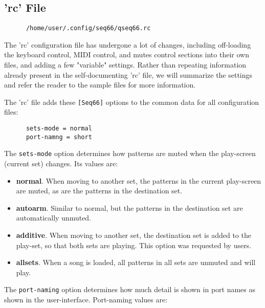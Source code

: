 \subsection{'rc' File}
\label{subsec:configuration_rc}

   \begin{verbatim}
      /home/user/.config/seq66/qseq66.rc
   \end{verbatim}

   The 'rc' configuration file has undergone a lot of changes, including
   off-loading the keyboard control, MIDI control, and mutes control sections
   into their own files, and adding a few "variable" settings.
   Rather than repeating information already present in the self-documenting
   'rc' file, we will summarize the settings and refer the reader to the sample
   files for more information.

   The 'rc' file adds these \texttt{[Seq66]} options to the common
   data for all configuration files:

   \begin{verbatim}
      sets-mode = normal
      port-namng = short
   \end{verbatim}

   The \texttt{sets-mode} option determines how patterns are muted when the
   play-screen (current set) changes.  Its values are:

   \begin{itemize}
      \item \textbf{normal}.
         When moving to another set, the patterns in the
         current play-screen are muted, as are the patterns in the destination
         set.
      \item \textbf{autoarm}.
         Similar to normal, but the patterns in the
         destination set are automatically unmuted.
      \item \textbf{additive}.
         When moving to another set, the destination set
         is added to the play-set, so that both sets are playing.
         This option was requested by users.
      \item \textbf{allsets}.
         When a song is loaded, all patterns in all sets are unmuted and will
         play.
   \end{itemize}

   The \texttt{port-naming} option determines how much detail is shown in
   port names as shown in the user-interface.
   Port-naming values are:

